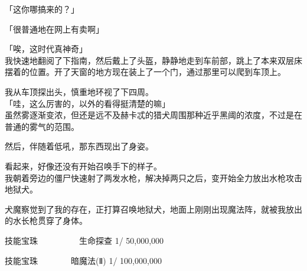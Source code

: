 「这你哪搞来的？」

「很普通地在网上有卖啊」

「唉，这时代真神奇」\\

我快速地翻阅了下指南，然后戴上了头盔，静静地走到车前部，跳上了本来双层床摆着的位置。开了天窗的地方现在装上了一个门，通过那里可以爬到车顶上。

我从车顶探出头，慎重地环视了下四周。\\

「哇，这么厉害的，以外的看得挺清楚的嘛」\\

虽然雾逐渐变浓，但还是远不及赫卡忒的猎犬周围那种近乎黑阈的浓度，不过是在普通的雾气的范围。

然后，伴随着低吼，那东西现出了身姿。

看起来，好像还没有开始召唤手下的样子。\\

我朝着旁边的僵尸快速射了两发水枪，解决掉两只之后，变开始全力放出水枪攻击地狱犬。

犬魔察觉到了我的存在，正打算召唤地狱犬，地面上刚刚出现魔法阵，就被我放出的水长枪贯穿了身体。\\

\cardline

  技能宝珠　　　　　生命探查 1/  50,000,000

  技能宝珠　　　　暗魔法(Ⅱ) 1/ 100,000,000

